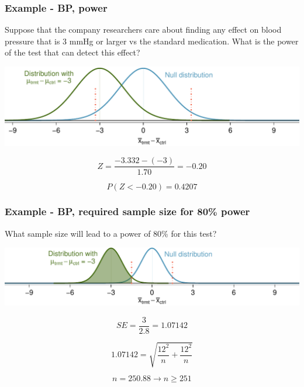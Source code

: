 \begin{frame}
\frametitle{Example - BP, power}

{\dq
{\footnotesize
Suppose that the company researchers care about finding any effect on blood pressure that is 3 mmHg or larger vs the standard medication. What is the power of the test that can detect this effect?
}}

\pause

\includegraphics[width=\textwidth]{7-4_power/figures/power/power_null_C_0_1-7_with_alt_at_3}

\pause

\[ Z = \frac{-3.332 - (-3)}{1.70} = -0.20 \]

\pause

\[ P(Z < -0.20) = 0.4207 \]

\end{frame}


\begin{frame}
\frametitle{Example - BP, required sample size for 80\% power}

{\dq
{\footnotesize
What sample size will lead to a power of 80\% for this test?
}}

\pause

\includegraphics[width=\textwidth]{7-4_power/figures/power/power_null_0_0-76_with_alt_at_3_and_shaded}

\pause

\[ SE = \frac{3}{2.8} = 1.07142 \]

\pause

\[ 1.07142 = \sqrt{ \frac{12^2}{n} + \frac{12^2}{n} } \]

\pause

\[ n = 250.88 \rightarrow n \ge 251 \]

\end{frame}

